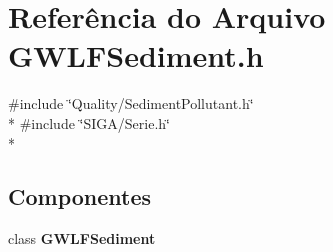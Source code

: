 \section{Referência do Arquivo G\+W\+L\+F\+Sediment.\+h}
\label{_g_w_l_f_sediment_8h}
{\ttfamily \#include \char`\"{}Quality/\+Sediment\+Pollutant.\+h\char`\"{}}\\*
{\ttfamily \#include \char`\"{}S\+I\+G\+A/\+Serie.\+h\char`\"{}}\\*
\subsection*{Componentes}
\begin{DoxyCompactItemize}
\item 
class {\bf G\+W\+L\+F\+Sediment}
\end{DoxyCompactItemize}
